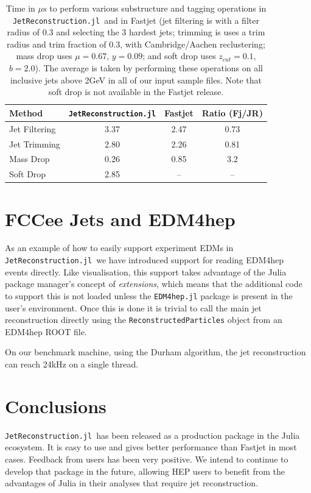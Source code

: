 \documentclass{webofc}
\newcommand{\JR}{\texttt{JetReconstruction.jl}}
\begin{document}
\begin{table}[ht]
    \begin{center}
        \begin{tabular}{l|ccc}
            \textbf{Method} & \textbf{\JR} & \textbf{Fastjet} & \textbf{Ratio (Fj/JR)}\\
            \hline
            Jet Filtering & 3.37 & 2.47 & 0.73 \\
            Jet Trimming & 2.80 & 2.26 & 0.81 \\
            Mass Drop & 0.26 & 0.85 & 3.2 \\
            Soft Drop & 2.85 & -- & -- \\
        \end{tabular}
        \caption{Time in $\mu\mathrm{s}$ to perform various substructure and
        tagging operations in \JR\ and in Fastjet (jet filtering is with a
        filter radius of 0.3 and selecting the 3 hardest jets; trimming is uses
        a trim radius and trim fraction of 0.3, with Cambridge/Aachen
        reclustering; mass drop uses $\mu = 0.67$, $y=0.09$; and soft drop
        uses $z_{cut}=0.1$, $b=2.0$). The average is taken by performing these
        operations on all inclusive jets above 2GeV in all of our input sample
        files. Note that soft drop is not available in the Fastjet release.}
        \label{tab:subtag}
    \end{center}
\end{table}

\section{FCCee Jets and EDM4hep}
\label{sec:fccee}

As an example of how to easily support experiment EDMs in \JR\ we have
introduced support for reading EDM4hep~\cite{Gaede:2022leb} events directly. Like
visualisation, this support takes advantage of the Julia package manager's
concept of \emph{extensions}, which means that the additional code to support
this is not loaded unless the \texttt{EDM4hep.jl} package is present in the
user's environment. Once this is done it is trivial to call the main jet
reconstruction directly using the \texttt{ReconstructedParticles} object from an
EDM4hep ROOT file.

On our benchmark machine, using the Durham algorithm, the jet reconstruction can
reach 24kHz on a single thread.

\section{Conclusions}
\label{sec:conclusions}

\JR\ has been released as a production package in the Julia ecosystem. It is
easy to use and gives better performance than Fastjet in most cases. Feedback
from users has been very positive. We intend to continue to develop that package
in the future, allowing HEP users to benefit from the advantages of Julia in
their analyses that require jet reconstruction.

\sloppy
\raggedright

\end{document}
